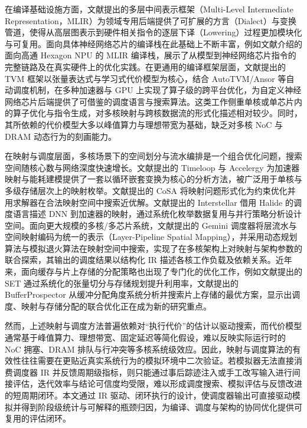 在编译基础设施方面，文献\parencite{lattner2021mlir}提出的多层中间表示框架（Multi-Level Intermediate Representation，MLIR）为领域专用后端提供了可扩展的方言（Dialect）与变换管道，使得从高层图表示到硬件相关指令的逐层下译（Lowering）过程更加模块化与可复用。面向具体神经网络芯片的编译栈在此基础上不断丰富，例如文献\parencite{qualcomm2026hexagonmlir}介绍的面向高通 Hexagon NPU 的 MLIR 编译栈，展示了从模型到神经网络芯片指令的完整链路及在真实硬件上的优化实践。在更通用的编译框架层面，文献\parencite{chen2018tvm}提出的 TVM 框架以张量表达式与学习式代价模型为核心，结合 AutoTVM/Ansor 等自动调度机制，在多种加速器与 GPU 上实现了算子级的跨平台优化，为自定义神经网络芯片后端提供了可借鉴的调度语言与搜索算法。这类工作侧重单核或单芯片内的算子优化与指令生成，对多核映射与跨核数据流的形式化描述相对较少。同时，其所依赖的代价模型大多以峰值算力与理想带宽为基础，缺乏对多核 NoC 与 DRAM 动态行为的刻画能力。

在映射与调度层面，多核场景下的空间划分与流水编排是一个组合优化问题，搜索空间随核心数与网络深度快速增长。文献\parencite{parashar2019timeloop,wu2019accelergy}提出的 Timeloop 与 Accelergy 为加速器映射与能耗建模提供了一套以循环嵌套变换为核心的分析方法，被广泛用于单核与多级存储层次上的映射枚举。文献\parencite{huang2021cosa}提出的 CoSA 将映射问题形式化为约束优化并用求解器在合法映射空间中搜索近优解。文献\parencite{yang2020interstellar}提出的 Interstellar 借用 Halide 的调度语言描述 DNN 到加速器的映射，通过系统化枚举数据复用与并行策略分析设计空间。面向更大规模的多核/多芯片系统，文献\parencite{cai2024gemini}提出的 Gemini 调度器将层流水与空间映射编码为统一的表示（Layer-Pipeline Spatial Mapping），并采用动态规划算法与模拟退火算法在映射空间中搜索，实现了在多核架构上对映射与架构参数的联合探索，其输出的调度结果以结构化 IR 描述各核工作负载及依赖关系。近年来，面向缓存与片上存储的分配策略也出现了专门化的优化工作，例如文献\parencite{set2023isca}提出的 SET 通过系统化的张量切分与存储规划提升利用率，文献\parencite{bufferprospector2024}提出的 BufferProspector 从缓冲分配角度系统分析并搜索片上存储的最优方案，显示出调度、映射与存储分配的联合优化正在成为新的研究重点。

然而，上述映射与调度方法普遍依赖对“执行代价”的估计以驱动搜索，而代价模型通常基于峰值算力、理想带宽、固定延迟等简化假设，难以反映实际运行时的 NoC 拥塞、DRAM 排队与行冲突等多核系统级效应。因此，映射与调度算法的有效性往往需要在更贴近真实系统行为的模拟环境中二次验证。若模拟器无法直接消费调度器 IR 并反馈周期级指标，则只能通过事后踪迹注入或手工改写输入进行间接评估，迭代效率与结论可信度均受限，难以形成调度搜索、模拟评估与反馈改进的短周期闭环。本文通过 IR 驱动、闭环执行的设计，使调度器输出可直接驱动模拟并得到阶段级统计与可解释的瓶颈归因，为编译、调度与架构的协同优化提供可复用的评估闭环。

